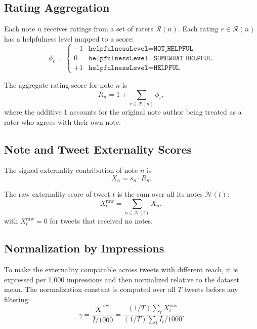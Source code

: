\documentclass[11pt]{article}
\begin{document}
\subsection{Rating Aggregation}

Each note $n$ receives ratings from a set of raters $\mathcal{R}(n)$.
Each rating $r \in \mathcal{R}(n)$ has a helpfulness level mapped to a score:
\begin{equation}
    \phi_r =
    \begin{cases}
        -1 & \texttt{helpfulnessLevel} = \texttt{NOT\_HELPFUL} \\
         0 & \texttt{helpfulnessLevel} = \texttt{SOMEWHAT\_HELPFUL} \\
        +1 & \texttt{helpfulnessLevel} = \texttt{HELPFUL}
    \end{cases}
\end{equation}

The aggregate rating score for note $n$ is
\begin{equation}
    R_n = 1 + \sum_{r \in \mathcal{R}(n)} \phi_r,
\end{equation}
where the additive $1$ accounts for the original note author being treated as a rater
who agrees with their own note.

\subsection{Note and Tweet Externality Scores}

The signed externality contribution of note $n$ is
\begin{equation}
    X_n = s_n \cdot R_n.
\end{equation}

The raw externality score of tweet $t$ is the sum over all its notes
$\mathcal{N}(t)$:
\begin{equation}
    X_t^{\text{raw}} = \sum_{n \in \mathcal{N}(t)} X_n,
\end{equation}
with $X_t^{\text{raw}} = 0$ for tweets that received no notes.

\subsection{Normalization by Impressions}

To make the externality comparable across tweets with different reach, it is expressed
per 1{,}000 impressions and then normalized relative to the dataset mean.
The normalization constant is computed over all $T$ tweets before any filtering:
\begin{equation}
    \gamma
    = \frac{\bar{X}^{\text{raw}}}{\bar{I}/1000}
    = \frac{(1/T)\sum_t X_t^{\text{raw}}}{(1/T)\sum_t I_t / 1000}.
\end{equation}
\end{document}
